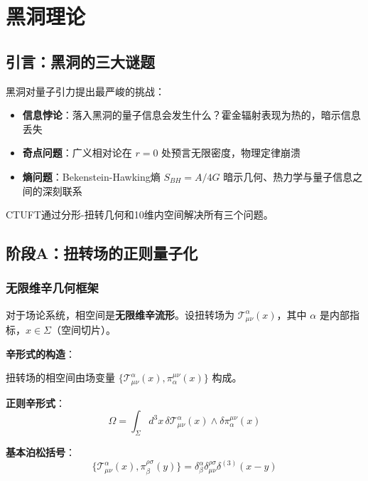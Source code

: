 \section{黑洞理论}
\label{sec:bh}

\subsection{引言：黑洞的三大谜题}

黑洞对量子引力提出最严峻的挑战：
\begin{itemize}
    \item \textbf{信息悖论}：落入黑洞的量子信息会发生什么？霍金辐射表现为热的，暗示信息丢失
    \item \textbf{奇点问题}：广义相对论在 $r = 0$ 处预言无限密度，物理定律崩溃
    \item \textbf{熵问题}：Bekenstein-Hawking熵 $S_{BH} = A/4G$ 暗示几何、热力学与量子信息之间的深刻联系
\end{itemize}

CTUFT通过分形-扭转几何和10维内空间解决所有三个问题。

\subsection{阶段A：扭转场的正则量子化}
\label{subsec:stageA_canonical}

\subsubsection{无限维辛几何框架}

对于场论系统，相空间是\textbf{无限维辛流形}。设扭转场为 $\mathcal{T}^\alpha_{\mu\nu}(x)$，其中 $\alpha$ 是内部指标，$x \in \Sigma$（空间切片）。

\textbf{辛形式的构造}：

扭转场的相空间由场变量 $\{\mathcal{T}^\alpha_{\mu\nu}(x), \pi_\alpha^{\mu\nu}(x)\}$ 构成。

\textbf{正则辛形式}：
\begin{equation}
\Omega = \int_\Sigma d^3x \, \delta \mathcal{T}^\alpha_{\mu\nu}(x) \wedge \delta \pi_\alpha^{\mu\nu}(x)
\end{equation}

\textbf{基本泊松括号}：
\begin{equation}
\{\mathcal{T}^\alpha_{\mu\nu}(x), \pi_\beta^{\rho\sigma}(y)\} = \delta_\beta^\alpha \delta_{\mu\nu}^{\rho\sigma} \delta^{(3)}(x-y)
\end{equation}

